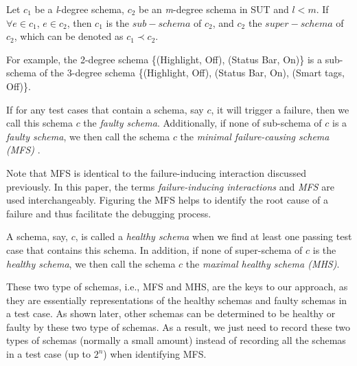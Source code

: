 \documentclass{sig-alternate-05-2015}
\begin{document}
\begin{definition}\label{de:subsume}
Let $c_{1}$ be a \emph{l}-degree schema, $c_{2}$ be an \emph{m}-degree schema in SUT and $l < m$. If $\forall e \in c_{1}$, $e \in c_{2}$, then $c_{1}$ is the $sub-schema$ of $c_{2}$, and $c_{2}$ the $super-schema$ of $c_{2}$, which can be denoted as $c_{1} \prec c_{2}$.
\end{definition}

For example,  the 2-degree schema \{(Highlight, Off), (Status Bar, On)\} is a sub-schema of the 3-degree schema \{(Highlight, Off), (Status Bar, On), (Smart tags, Off)\}.

\begin{definition} \label{de:faulty:minimal}
If for any test cases that contain a schema, say $c$, it will trigger a failure, then we call this schema $c$ the \emph{faulty schema}. Additionally, if none of sub-schema of $c$ is a \emph{faulty schema}, we then call the schema $c$ the \emph{minimal failure-causing schema (MFS)} \cite{nie2011minimal}.

\end{definition}

Note that MFS is identical to the failure-inducing interaction discussed previously. In this paper, the terms \emph{failure-inducing interactions} and \emph{MFS} are used interchangeably. Figuring the MFS helps to identify the root cause of a failure and thus facilitate the debugging process.


\begin{definition}\label{de:healthy:maximal}
A schema, say, $c$, is called a \emph{healthy schema} when we find at least one passing test case that contains this schema. In addition, if none of super-schema of $c$ is the \emph{healthy schema}, we then call the schema $c$ the \emph{maximal healthy schema (MHS)}.
\end{definition}

These two type of schemas, i.e., MFS and MHS, are the keys to our approach, as they are essentially representations of the healthy schemas and faulty schemas in a test case. As shown later, other schemas can be determined to be healthy or faulty by these two type of schemas. As a result, we just need to record these two types of schemas (normally a small amount) instead of recording all the schemas in a test case (up to $2^{n}$) when identifying MFS.
\end{document}
